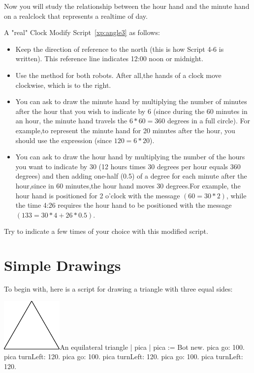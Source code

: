 \documentclass[a4paper,10pt,twoside]{book}
\begin{document}
Now you will study the relationship between the hour hand and the minute hand on a 
realclock that represents a realtime of day. 


\begin{exonofigtitle}{A "real" Clock}
	Modify Script~\ref{xp:angle3} as follows: 

\begin{itemize} 
	\item Keep the direction of reference to the north (this is how Script 4-6 is written). This reference line 
	indicates 12:00 noon or midnight. 
	\item  Use the method  for both robots. After all,the hands of a clock move clockwise, which is 
	to the right. 
	\item  You can ask  to draw the minute hand by multiplying the number of minutes after the hour 
	that you wish to indicate by 6 (since during the 60 minutes in an hour, the minute hand travels the 
	$6 * 60 = 360$ degrees in a full circle). For example,to represent the minute hand for 20 minutes after 
	the hour, you should use the expression  (since $120 = 6  * 20$). 
	\item  You can ask  to draw the hour hand by multiplying the number of the hours you want to indicate 
	by 30 (12 hours times 30 degrees per hour equals 360 degrees) and then adding one-half (0.5) 
	of a degree for each minute after the hour,since in 60 minutes,the hour hand moves 30 degrees.For 
	example, the hour hand is positioned for 2 o'clock with the message  $(60 = 30 * 2)$, 
	while the time 4:26 requires the hour hand to be positioned with the message  
	$(133 = 30 * 4 + 26 * 0.5)$. 
\end{itemize}
Try to indicate a few times of your choice with this modified script. 
\end{exonofigtitle}
	
\section{Simple Drawings}

To begin with, here is a script for drawing a triangle with three equal sides: 


\begin{scriptfigwithsize}[0.4]{\includegraphics[width=3cm]{ChTurnfirstTriangle}}{An equilateral triangle}\label{xp:triangle}
	| pica | 
	pica := Bot new. 
	pica go: 100. 
	pica turnLeft: 120. 
	pica go: 100. 
	pica turnLeft: 120. 
	pica go: 100. 
	pica turnLeft: 120. 
\end{scriptfigwithsize}
\end{document}
